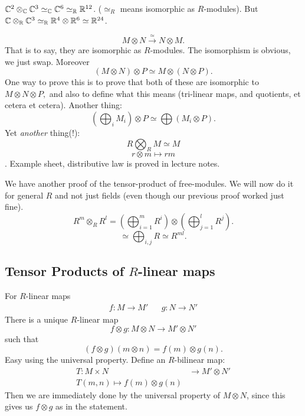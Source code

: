 \documentclass{article}
\begin{document}
    \note $\mathbb{C}^{2} \otimes_{\mathbb{C}} \mathbb{C}^{3} \simeq_{\mathbb{C}} \mathbb{C}^{6} \simeq_{\mathbb{R}} \mathbb{R}^{12}$. ($\simeq_{R}$ means isomorphic as $R$-modules). \gap But $\mathbb{C} \otimes_{\mathbb{R}} \mathbb{C}^{3} \simeq_{\mathbb{R}} \mathbb{R}^{4} \otimes \mathbb{R}^{6} \simeq \mathbb{R}^{24}$.
    \begin{fancyprop} \[M \otimes N \xrightarrow{\simeq} N \otimes M.\] That is to say, they are isomorphic as $R$-modules. The isomorphism is obvious, we just swap. Moreover \[ (M \otimes N) \otimes P \simeq M \otimes (N \otimes P).\] One way to prove this is to prove that both of these are isomorphic to $M \otimes N \otimes P,$ and also to define what this means (tri-linear maps, and quotients, et cetera et cetera). \gap Another thing: \[ \left(\bigoplus_{i} M_{i}\right) \otimes P \simeq \bigoplus( M_{i} \otimes P).\] Yet \textit{another} thing(!):
    \[ R \bigotimes_{R} M \simeq M\] \[ r \otimes m \mapsto rm\].
    \proof Example sheet, distributive law is proved in lecture notes.
    \end{fancyprop}
    \cor We have another proof of the tensor-product of free-modules. We will now do it for general $R$ and not just fields (even though our previous proof worked just fine).
    \proof \[ R^{m} \otimes_{R} R^{l} = \left(\bigoplus_{i=1}^{m} R^{i} \right) \otimes \left( \bigoplus_{j=1}^{l} R^{j} \right). \]
    \[ \simeq \bigoplus_{i,j} R \simeq R^{ml}. \] \endproof
    \subsection{Tensor Products of $R$-linear maps}
    \prop For $R$-linear maps \begin{align*}
        f:M \to M' & & g: N \to N'
    \end{align*}
    There is a unique $R$-linear map \[ f\otimes g : M \otimes N \to M' \otimes N' \] such that \[ (f \otimes g)(m \otimes n) = f(m) \otimes g(n).\]
    \proof Easy using the universal property. Define an $R$-bilinear map: \begin{align*} T: M \times N &\to M' \otimes N' \\ T(m,n) \mapsto f(m) \otimes g(n) \end{align*}
    Then we are immediately done by the universal property of $M \otimes N$, since this gives us $f \otimes g$ as in the statement. \endproof
    




\newlec
\end{document}
